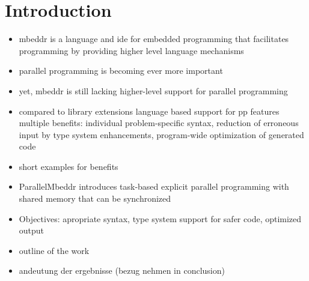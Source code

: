 \chapter{Introduction}

\begin{itemize}
\item mbeddr is a language and ide for embedded programming that facilitates programming by providing higher level language mechanisms
\item parallel programming is becoming ever more important
\item yet, mbeddr is still lacking higher-level support for parallel programming
\item compared to library extensions language based support for pp features multiple benefits: individual problem-specific syntax, reduction of erroneous input by type system enhancements, program-wide optimization of generated code
\item short examples for benefits
\item ParallelMbeddr introduces task-based explicit parallel programming with shared memory that can be synchronized
\item Objectives: apropriate syntax, type system support for safer code, optimized output
\item outline of the work
\item andeutung der ergebnisse (bezug nehmen in conclusion)
\end{itemize}

